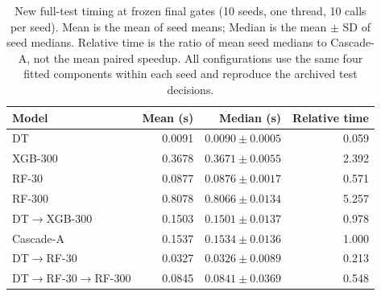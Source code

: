 \begin{table}[!htbp]
\centering
\caption{New full-test timing at frozen final gates (10 seeds, one thread, 10 calls per seed). Mean is the mean of seed means; Median is the mean $\pm$ SD of seed medians. Relative time is the ratio of mean seed medians to Cascade-A, not the mean paired speedup. All configurations use the same four fitted components within each seed and reproduce the archived test decisions.}
\label{tab:cost}
\small
\setlength{\tabcolsep}{4pt}
\begin{tabularx}{\textwidth}{@{}Xrrr@{}}
\toprule
Model & Mean (s) & Median (s) & Relative time \\
\midrule
DT & 0.0091 & $0.0090\pm0.0005$ & 0.059 \\
XGB-300 & 0.3678 & $0.3671\pm0.0055$ & 2.392 \\
RF-30 & 0.0877 & $0.0876\pm0.0017$ & 0.571 \\
RF-300 & 0.8078 & $0.8066\pm0.0134$ & 5.257 \\
DT$\to$XGB-300 & 0.1503 & $0.1501\pm0.0137$ & 0.978 \\
Cascade-A & 0.1537 & $0.1534\pm0.0136$ & 1.000 \\
DT$\to$RF-30 & 0.0327 & $0.0326\pm0.0089$ & 0.213 \\
DT$\to$RF-30$\to$RF-300 & 0.0845 & $0.0841\pm0.0369$ & 0.548 \\
\bottomrule
\end{tabularx}
\end{table}
